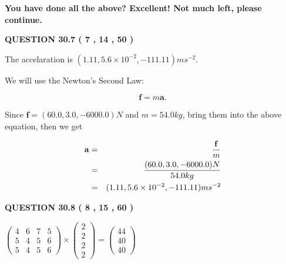 \documentclass[12pt]{article}
\begin{document}
 
 
   
   
\vspace{0.3in}
{\textbf{\LARGE{You have done all the above? Excellent! Not much left, please continue.}}}
\vspace{0.3in}
   
   
  
\vspace{0.2in}
  
{\textbf{\Large{QUESTION
30.7 
 (           7 ,          14 ,          50 )
}}}
  
  
 
 
\noindent{}
 
 
  The accelaration is $  %
(
1.11,
5.6 \times 10^{-2},
-111.11)
ms^{-2} $.
 
 
 
 
 
 
\noindent{}

We will use the Newton's Second Law:
 
\[
\mathbf{f}=m\mathbf{a}.
\]
 
Since $\mathbf{f}= %
(60.0 , 3.0 , -6000.0) N$
and $m= %
54.0kg$, bring them into the above equation, then we get
 
\begin{eqnarray*}
\mathbf{a}&=&\frac{\mathbf{f}}m  \\
&=&\frac{ %
(60.0 , 3.0 , -6000.0) N}{ %
54.0kg}  \\
&=& %
(1.11 , 5.6 \times 10^{-2} , -111.11) ms^{-2}
\end{eqnarray*}
 
 
 
  
\vspace{0.2in}
  
{\textbf{\Large{QUESTION
30.8 
 (           8 ,          15 ,          60 )
}}}
  
  
 
 
\noindent{}

 
$\left( \begin{array}{ccccccccccccccc}
           4  & 
           6  & 
           7  & 
           5  \\ 
           5  & 
           4  & 
           5  & 
           6  \\ 
           5  & 
           4  & 
           5  & 
           6
\end{array}\right) \times
\left( \begin{array}{c}
           2  \\ 
           2  \\ 
           2  \\ 
           2
\end{array}\right)  =
\left( \begin{array}{c}
          44  \\ 
          40  \\ 
          40
\end{array}\right)  $
 
\end{document}
